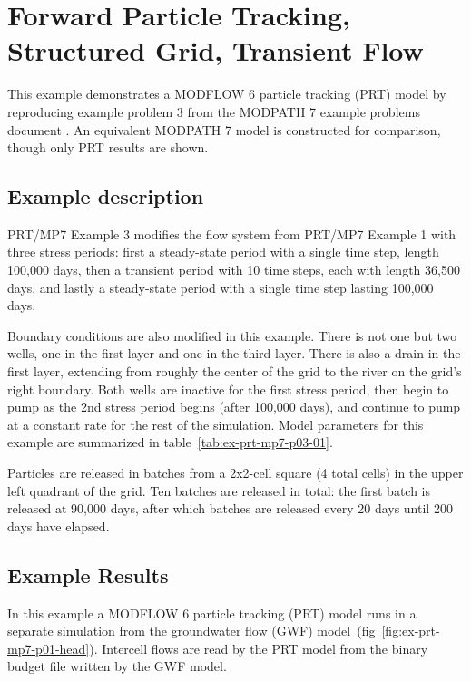 \section{Forward Particle Tracking, Structured Grid, Transient Flow}

This example demonstrates a MODFLOW 6 particle tracking (PRT) model by reproducing example problem 3 from the MODPATH 7 \citep{pollock2016modpath7} example problems document \citep{modpath7examples}. An equivalent MODPATH 7 model is constructed for comparison, though only PRT results are shown.

\subsection{Example description}

PRT/MP7 Example 3 modifies the flow system from PRT/MP7 Example 1 with three stress periods: first a steady-state period with a single time step, length 100,000 days, then a transient period with 10 time steps, each with length 36,500 days, and lastly a steady-state period with a single time step lasting 100,000 days.

Boundary conditions are also modified in this example. There is not one but two wells, one in the first layer and one in the third layer. There is also a drain in the first layer, extending from roughly the center of the grid to the river on the grid's right boundary. Both wells are inactive for the first stress period, then begin to pump as the 2nd stress period begins (after 100,000 days), and continue to pump at a constant rate for the rest of the simulation. Model parameters for this example are summarized in table~\ref{tab:ex-prt-mp7-p03-01}.

Particles are released in batches from a 2x2-cell square (4 total cells) in the upper left quadrant of the grid. Ten batches are released in total: the first batch is released at 90,000 days, after which batches are released every 20 days until 200 days have elapsed.



\subsection{Example Results}

In this example a MODFLOW 6 particle tracking (PRT) model runs in a separate simulation from the groundwater flow (GWF) model~(fig~\ref{fig:ex-prt-mp7-p01-head}). Intercell flows are read by the PRT model from the binary budget file written by the GWF model.

